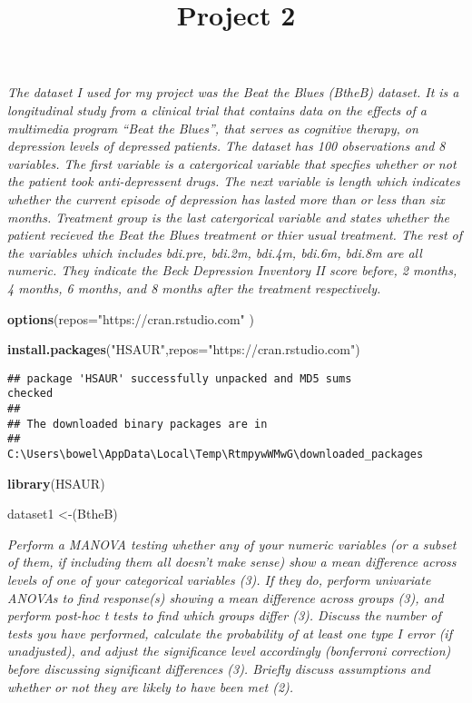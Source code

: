 \documentclass[
]{article}
\title{Project 2}
\author{}
\date{\vspace{-2.5em}}
\newenvironment{Shaded}{\begin{snugshade}}{\end{snugshade}}
\newcommand{\DataTypeTok}[1]{\textcolor[rgb]{0.13,0.29,0.53}{#1}}
\newcommand{\KeywordTok}[1]{\textcolor[rgb]{0.13,0.29,0.53}{\textbf{#1}}}
\newcommand{\NormalTok}[1]{#1}
\newcommand{\StringTok}[1]{\textcolor[rgb]{0.31,0.60,0.02}{#1}}
\begin{document}
\maketitle

\emph{The dataset I used for my project was the Beat the Blues (BtheB)
dataset. It is a longitudinal study from a clinical trial that contains
data on the effects of a multimedia program ``Beat the Blues'', that
serves as cognitive therapy, on depression levels of depressed patients.
The dataset has 100 observations and 8 variables. The first variable is
a catergorical variable that specfies whether or not the patient took
anti-depressent drugs. The next variable is length which indicates
whether the current episode of depression has lasted more than or less
than six months. Treatment group is the last catergorical variable and
states whether the patient recieved the Beat the Blues treatment or
thier usual treatment. The rest of the variables which includes bdi.pre,
bdi.2m, bdi.4m, bdi.6m, bdi.8m are all numeric. They indicate the Beck
Depression Inventory II score before, 2 months, 4 months, 6 months, and
8 months after the treatment respectively. }

\begin{Shaded}
\begin{Highlighting}[]
\KeywordTok{options}\NormalTok{(}\DataTypeTok{repos=}\StringTok{"https://cran.rstudio.com"}\NormalTok{ )}

\KeywordTok{install.packages}\NormalTok{(}\StringTok{"HSAUR"}\NormalTok{,}\DataTypeTok{repos=}\StringTok{"https://cran.rstudio.com"}\NormalTok{)}
\end{Highlighting}
\end{Shaded}

\begin{verbatim}
## package 'HSAUR' successfully unpacked and MD5 sums
checked
##
## The downloaded binary packages are in
##
C:\Users\bowel\AppData\Local\Temp\RtmpywWMwG\downloaded_packages
\end{verbatim}

\begin{Shaded}
\begin{Highlighting}[]
\KeywordTok{library}\NormalTok{(HSAUR)}

\NormalTok{dataset1 <-(BtheB)}
\end{Highlighting}
\end{Shaded}

\emph{Perform a MANOVA testing whether any of your numeric variables (or
a subset of them, if including them all doesn't make sense) show a mean
difference across levels of one of your categorical variables (3). If
they do, perform univariate ANOVAs to find response(s) showing a mean
difference across groups (3), and perform post-hoc t tests to find which
groups differ (3). Discuss the number of tests you have performed,
calculate the probability of at least one type I error (if unadjusted),
and adjust the significance level accordingly (bonferroni correction)
before discussing significant differences (3). Briefly discuss
assumptions and whether or not they are likely to have been met (2).}
\end{document}
